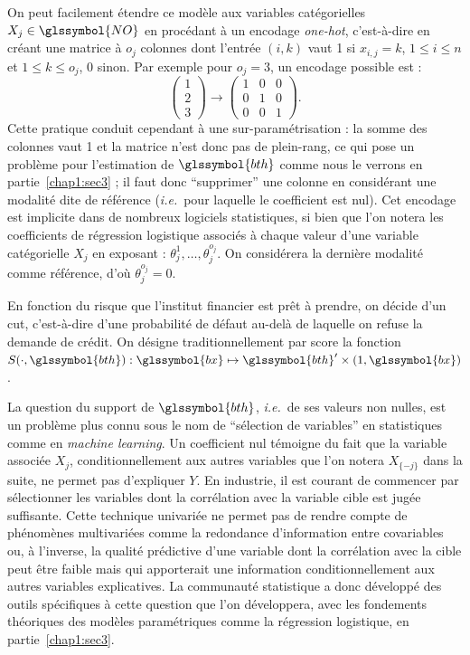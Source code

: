On peut facilement étendre ce modèle aux variables catégorielles $X_j \in \glssymbol{NO}$ en procédant à un encodage \textit{one-hot}, c'est-à-dire en créant une matrice à $o_j$ colonnes dont l'entrée $(i,k)$ vaut 1 si $x_{i,j} = k$, $1 \leq i \leq n$ et $1 \leq k \leq o_j$, 0 sinon. Par exemple pour $o_j=3$, un encodage possible est :
$$ \left( \begin{array}{c} 1 \\ 2 \\ 3 \end{array} \right) \to \left( \begin{array}{ccc} 1 & 0 & 0 \\ 0 & 1 & 0 \\ 0 & 0 & 1 \end{array} \right).$$
Cette pratique conduit cependant à une sur-paramétrisation : la somme des colonnes vaut 1 et la matrice n'est donc pas de plein-rang, ce qui pose un problème pour l'estimation de $\glssymbol{bth}$ comme nous le verrons en partie~\ref{chap1:sec3} ; il faut donc ``supprimer'' une colonne en considérant une modalité dite de référence (\textit{i.e.}\ pour laquelle le coefficient est nul). Cet encodage est implicite dans de nombreux logiciels statistiques, si bien que l'on notera les coefficients de régression logistique associés à chaque valeur d'une variable catégorielle $X_j$ en exposant : $\theta_j^{1},\dots,\theta_j^{o_j}$. On considérera la dernière modalité comme référence, d'où $\theta_j^{o_j} = 0$.

En fonction du risque que l'institut financier est prêt à prendre, on décide d'un \gls{cut}, c'est-à-dire d'une probabilité de défaut au-delà de laquelle on refuse la demande de crédit. On désigne traditionnellement par \gls{score} la fonction $S(\cdot,\glssymbol{bth}): \glssymbol{bx} \mapsto \glssymbol{bth}' \times (1,\glssymbol{bx})$.

La question du support  de $\glssymbol{bth}$, \textit{i.e.}\ de ses valeurs non nulles, est un problème plus connu sous le nom de ``sélection de variables'' en statistiques comme en \textit{machine learning}. Un coefficient nul témoigne du fait que la variable associée $X_j$, conditionnellement aux autres variables que l'on notera $X_{\{-j\}}$ dans la suite, ne permet pas d'expliquer $Y$. En industrie, il est courant de commencer par sélectionner les variables dont la corrélation avec la variable cible est jugée suffisante. Cette technique univariée ne permet pas de rendre compte de phénomènes multivariées comme la redondance d'information entre covariables ou, à l'inverse, la qualité prédictive d'une variable dont la corrélation avec la cible peut être faible mais qui apporterait une information conditionnellement aux autres variables explicatives. La communauté statistique a donc développé des outils spécifiques à cette question que l'on développera, avec les fondements théoriques des modèles paramétriques comme la régression logistique, en partie~\ref{chap1:sec3}.

